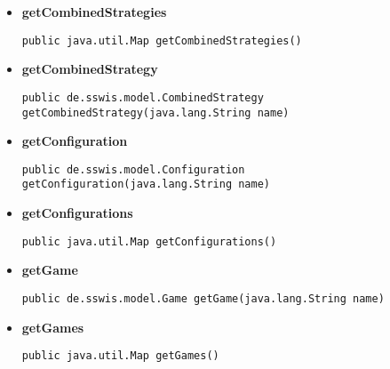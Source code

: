{{{{{{\begin{itemize}
{\begin{lstlisting}[frame=none]
public java.util.Map getAgents()\end{lstlisting} %
}%
\item{ 
\hypertarget{de.sswis.controller.ModelProvider.getCombinedStrategies()}{{\bf  getCombinedStrategies}\\}
\begin{lstlisting}[frame=none]
public java.util.Map getCombinedStrategies()\end{lstlisting} %
}%
\item{ 
\hypertarget{de.sswis.controller.ModelProvider.getCombinedStrategy(java.lang.String)}{{\bf  getCombinedStrategy}\\}
\begin{lstlisting}[frame=none]
public de.sswis.model.CombinedStrategy getCombinedStrategy(java.lang.String name)\end{lstlisting} %
}%
\item{ 
\hypertarget{de.sswis.controller.ModelProvider.getConfiguration(java.lang.String)}{{\bf  getConfiguration}\\}
\begin{lstlisting}[frame=none]
public de.sswis.model.Configuration getConfiguration(java.lang.String name)\end{lstlisting} %
}%
\item{ 
\hypertarget{de.sswis.controller.ModelProvider.getConfigurations()}{{\bf  getConfigurations}\\}
\begin{lstlisting}[frame=none]
public java.util.Map getConfigurations()\end{lstlisting} %
}%
\item{ 
\hypertarget{de.sswis.controller.ModelProvider.getGame(java.lang.String)}{{\bf  getGame}\\}
\begin{lstlisting}[frame=none]
public de.sswis.model.Game getGame(java.lang.String name)\end{lstlisting} %
}%
\item{ 
\hypertarget{de.sswis.controller.ModelProvider.getGames()}{{\bf  getGames}\\}
\begin{lstlisting}[frame=none]
public java.util.Map getGames()\end{lstlisting} %
}
\end{itemize}}}}}}}
